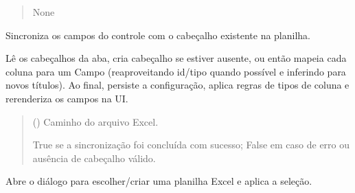 \documentclass[letterpaper,10pt,english]{sphinxmanual}
\begin{document}
\begin{fulllineitems}
\begin{fulllineitems}
\begin{quote}
\begin{description}
\sphinxAtStartPar
None

\end{description}\end{quote}

\end{fulllineitems}


\begin{fulllineitems}
\label{\detokenize{api/app:app.App.sync_fields_from_existing_excel}}
\pysigstartsignatures
\pysiglinewithargsret
{}
{}
{}
\pysigstopsignatures
\sphinxAtStartPar
Sincroniza os campos do controle com o cabeçalho existente na planilha.

\sphinxAtStartPar
Lê os cabeçalhos da aba, cria cabeçalho se estiver ausente, ou então mapeia
cada coluna para um Campo (reaproveitando id/tipo quando possível e inferindo
para novos títulos). Ao final, persiste a configuração, aplica regras de
tipos de coluna e re\sphinxhyphen{}renderiza os campos na UI.
\begin{quote}\begin{description}
\sphinxAtStartPar
{} () \textendash{} Caminho do arquivo Excel.

\sphinxAtStartPar
True se a sincronização foi concluída com sucesso; False em caso de erro
ou ausência de cabeçalho válido.

\sphinxAtStartPar
{}

\end{description}\end{quote}

\end{fulllineitems}


\begin{fulllineitems}
\label{\detokenize{api/app:app.App.choose_file}}
\pysigstartsignatures
\pysiglinewithargsret
{}
{}
{}
\pysigstopsignatures
\sphinxAtStartPar
Abre o diálogo para escolher/criar uma planilha Excel e aplica a seleção.


\end{fulllineitems}
\end{fulllineitems}
\end{document}
